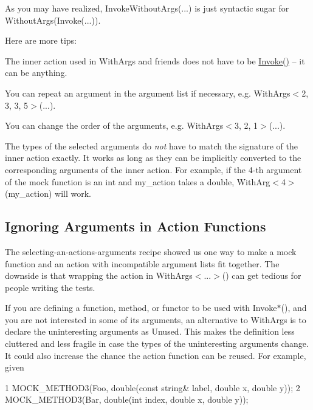 As you may have realized, {\ttfamily Invoke\+Without\+Args(...)} is just syntactic sugar for {\ttfamily Without\+Args(Invoke(...))}.

Here are more tips\+:


\begin{DoxyItemize}
\item The inner action used in {\ttfamily With\+Args} and friends does not have to be {\ttfamily \hyperlink{namespacetesting_a12aebaf8363d49a383047529f798b694}{Invoke()}} -- it can be anything.
\item You can repeat an argument in the argument list if necessary, e.\+g. {\ttfamily With\+Args$<$2, 3, 3, 5$>$(...)}.
\item You can change the order of the arguments, e.\+g. {\ttfamily With\+Args$<$3, 2, 1$>$(...)}.
\item The types of the selected arguments do {\itshape not} have to match the signature of the inner action exactly. It works as long as they can be implicitly converted to the corresponding arguments of the inner action. For example, if the 4-\/th argument of the mock function is an {\ttfamily int} and {\ttfamily my\+\_\+action} takes a {\ttfamily double}, {\ttfamily With\+Arg$<$4$>$(my\+\_\+action)} will work.
\end{DoxyItemize}

\subsection*{Ignoring Arguments in Action Functions}

The selecting-\/an-\/action\textquotesingle{}s-\/arguments recipe showed us one way to make a mock function and an action with incompatible argument lists fit together. The downside is that wrapping the action in {\ttfamily With\+Args$<$...$>$()} can get tedious for people writing the tests.

If you are defining a function, method, or functor to be used with {\ttfamily Invoke$\ast$()}, and you are not interested in some of its arguments, an alternative to {\ttfamily With\+Args} is to declare the uninteresting arguments as {\ttfamily Unused}. This makes the definition less cluttered and less fragile in case the types of the uninteresting arguments change. It could also increase the chance the action function can be reused. For example, given


\begin{DoxyCode}
1 MOCK\_METHOD3(Foo, double(const string& label, double x, double y));
2 MOCK\_METHOD3(Bar, double(int index, double x, double y));
\end{DoxyCode}


